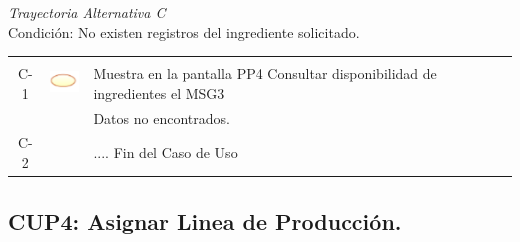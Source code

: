 \documentclass[10pt,spanish]{article}
\providecommand{\tabularnewline}{\\}
\begin{document}
	\textit{Trayectoria Alternativa C}\\
	Condición: No existen registros del ingrediente solicitado.\\
	\begin{tabular}{ccl}
	& & \tabularnewline
	C-1 & \includegraphics{sistema} & Muestra en la pantalla PP4 Consultar disponibilidad de ingredientes el MSG3\tabularnewline
	& &  Datos no encontrados.\tabularnewline
	C-2 & & .... Fin del Caso de Uso\tabularnewline
	\end{tabular}
	

\newpage
\subsection{CUP4: Asignar Linea de Producción.}
\end{document}
